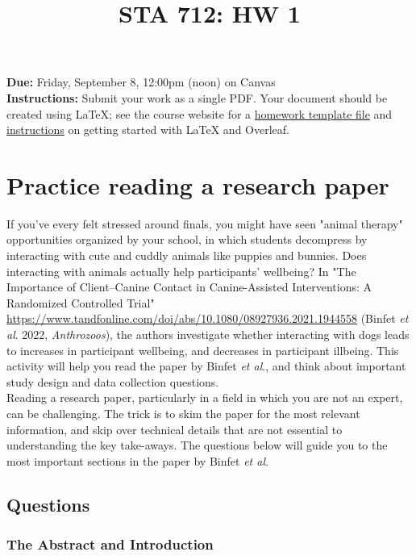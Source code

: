 \documentclass[12pt]{article}
\title{STA 712: HW 1}
\author{}
\date{}
\begin{document}
\maketitle

\noindent \textbf{Due:} Friday, September 8, 12:00pm (noon) on Canvas\\

\noindent \textbf{Instructions:} Submit your work as a single PDF. Your document should be created using LaTeX; see the course website for a \href{https://sta712-f23.github.io/homework/hw_template.tex}{homework template file} and \href{https://sta712-f23.github.io/homework/latex_instructions/}{instructions} on getting started with LaTeX and Overleaf.

\section{Practice reading a research paper}

If you've every felt stressed around finals, you might have seen "animal therapy" opportunities organized by your school, in which students decompress by interacting with cute and cuddly animals like puppies and bunnies. Does interacting with animals actually help participants' wellbeing? In "The Importance of Client–Canine Contact in Canine-Assisted Interventions: A Randomized Controlled Trial" \url{https://www.tandfonline.com/doi/abs/10.1080/08927936.2021.1944558} (Binfet \textit{et al}. 2022, \textit{Anthrozoos}), the authors investigate whether interacting with dogs leads to increases in participant wellbeing, and decreases in participant illbeing. This activity will help you read the paper by Binfet \textit{et al}., and think about important study design and data collection questions.\\

\noindent Reading a research paper, particularly in a field in which you are not an expert, can be challenging. The trick is to skim the paper for the most relevant information, and skip over technical details that are not essential to understanding the key take-aways. The questions below will guide you to the most important sections in the paper by Binfet \textit{et al}.

\subsection*{Questions}

\subsubsection*{The Abstract and Introduction}
\end{document}
